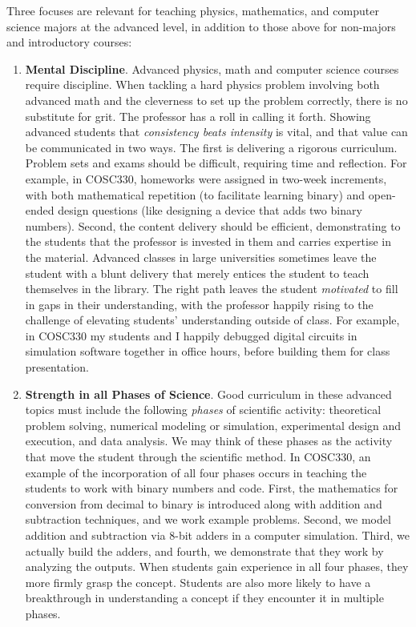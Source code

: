 \documentclass[../../main.tex]{subfiles}
\begin{document}
Three focuses are relevant for teaching physics, mathematics, and computer science majors at the advanced level, in addition to those above for non-majors and introductory courses:
\begin{enumerate}
\item \textbf{Mental Discipline}.  Advanced physics, math and computer science courses require discipline.  When tackling a hard physics problem involving both advanced math and the cleverness to set up the problem correctly, there is no substitute for grit.  The professor has a roll in calling it forth.  Showing advanced students that \textit{consistency beats intensity} is vital, and that value can be communicated in two ways.  The first is delivering a rigorous curriculum.  Problem sets and exams should be difficult, requiring time and reflection.  For example, in COSC330, homeworks were assigned in two-week increments, with both mathematical repetition (to facilitate learning binary) and open-ended design questions (like designing a device that adds two binary numbers).  Second, the content delivery should be efficient, demonstrating to the students that the professor is invested in them and carries expertise in the material.  Advanced classes in large universities sometimes leave the student with a blunt delivery that merely entices the student to teach themselves in the library.  The right path leaves the student \textit{motivated} to fill in gaps in their understanding, with the professor happily rising to the challenge of elevating students' understanding outside of class.  For example, in COSC330 my students and I happily debugged digital circuits in simulation software together in office hours, before building them for class presentation.

\item \textbf{Strength in all Phases of Science}. Good curriculum in these advanced topics must include the following \textit{phases} of scientific activity: theoretical problem solving, numerical modeling or simulation, experimental design and execution, and data analysis.  We may think of these phases as the activity that move the student through the scientific method.  In COSC330, an example of the incorporation of all four phases occurs in teaching the students to work with binary numbers and code.  First, the mathematics for conversion from decimal to binary is introduced along with addition and subtraction techniques, and we work example problems.  Second, we model addition and subtraction via 8-bit adders in a computer simulation.  Third, we actually build the adders, and fourth, we demonstrate that they work by analyzing the outputs.  When students gain experience in all four phases, they more firmly grasp the concept.  Students are also more likely to have a breakthrough in understanding a concept if they encounter it in multiple phases.


\end{enumerate}
\end{document}

